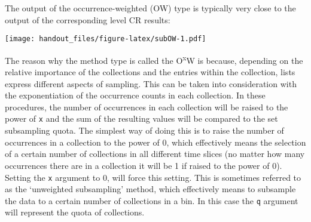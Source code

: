 \documentclass[]{article}
\newenvironment{Shaded}{\begin{snugshade}}{\end{snugshade}}
\newcommand{\DataTypeTok}[1]{\textcolor[rgb]{0.13,0.29,0.53}{#1}}
\newcommand{\DecValTok}[1]{\textcolor[rgb]{0.00,0.00,0.81}{#1}}
\newcommand{\KeywordTok}[1]{\textcolor[rgb]{0.13,0.29,0.53}{\textbf{#1}}}
\newcommand{\NormalTok}[1]{#1}
\newcommand{\OperatorTok}[1]{\textcolor[rgb]{0.81,0.36,0.00}{\textbf{#1}}}
\newcommand{\StringTok}[1]{\textcolor[rgb]{0.31,0.60,0.02}{#1}}
\begin{document}
The output of the occurrence-weighted (OW) type is typically very close
to the output of the corresponding level CR results:

\begin{Shaded}
\end{Shaded}

\texttt{[image: handout\_files/figure-latex/subOW-1.pdf]}

The reason why the method type is called the O\textsuperscript{x}W is
because, depending on the relative importance of the collections and the
entries within the collection, lists express different aspects of
sampling. This can be taken into consideration with the exponentiation
of the occurrence counts in each collection. In these procedures, the
number of occurrences in each collection will be raised to the power of
\texttt{x} and the sum of the resulting values will be compared to the
set subsampling quota. The simplest way of doing this is to raise the
number of occurrences in a collection to the power of 0, which
effectively means the selection of a certain number of collections in
all different time slices (no matter how many occurrences there are in a
collection it will be 1 if raised to the power of 0). Setting the
\texttt{x} argument to 0, will force this setting. This is sometimes
referred to as the `unweighted subsampling' method, which effectively
means to subsample the data to a certain number of collections in a bin.
In this case the \texttt{q} argument will represent the quota of
collections.
\end{document}
